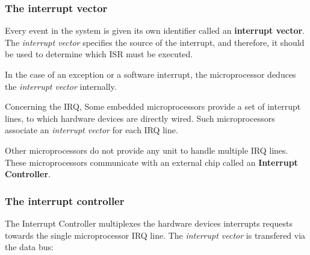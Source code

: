 \begin{frame}
  \frametitle{The interrupt vector}

  Every event in the system is given its own identifier called an
  {\bf interrupt vector}. The {\em interrupt vector} specifies the source of
  the interrupt, and therefore, it should be used to determine which ISR must
  be executed.

  \-

  In the case of an exception or a software interrupt, the microprocessor
  deduces the {\em interrupt vector} internally.

  \-

  Concerning the IRQ,
  Some embedded microprocessors provide a set of interrupt lines, to which
  hardware devices are directly wired. Such microprocessors associate an
  {\em interrupt vector} for each IRQ line.

  \-

  Other microprocessors do not provide any unit to handle multiple IRQ lines.
  These microprocessors communicate with an external chip called an
  {\bf Interrupt Controller}.


\end{frame}

%
%
%

\begin{frame}
  \frametitle{The interrupt controller}

  The Interrupt Controller multiplexes the hardware devices interrupts requests
  towards the single microprocessor IRQ line. The {\em interrupt vector} is
  transfered via the data bus:

  \-

  \begin{center}
  \end{center}

\end{frame}

%
%
%

